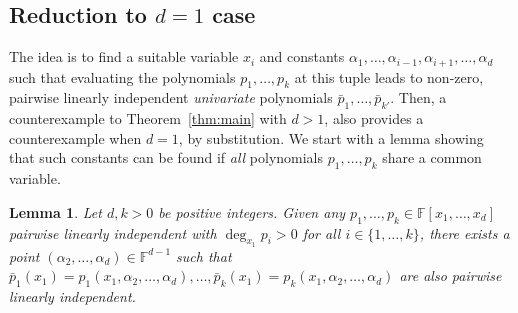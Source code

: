 \documentclass{amsart}
\newtheorem{lemma}[theorem]{Lemma}
\theoremstyle{definition}
\theoremstyle{remark}
\numberwithin{equation}{section}
\newcommand{\F}{\mathbb{F}}
\begin{document}
\subsection{Reduction to $ d=1 $ case}
\label{sse:reduction_to_d1}
The idea is to find a suitable variable $ x_i $ and constants $ \alpha_1,
\ldots, \alpha_{i-1}, \alpha_{i+1}, \ldots, \alpha_d $ such that evaluating the polynomials
$ p_1, \ldots, p_k $ at this tuple leads to
non-zero, pairwise linearly independent \emph{univariate} polynomials $
\bar{p}_1, \ldots, \bar{p}_{k'} $. Then, a counterexample to
Theorem~\ref{thm:main} with $ d > 1 $, also provides a counterexample when $ d =
1 $, by substitution. We start with a lemma showing that such constants can be found
if \emph{all} polynomials $ p_1, \ldots, p_k $ share a common variable. 

\begin{lemma}
	\label{lem:projection}
	Let $ d,k>0 $ be positive integers. Given any $ p_1, \ldots, p_k
	\in \F[x_1, \ldots, x_d]$ pairwise linearly independent with $ \deg_{x_1}
	p_i > 0 $ for all $ i \in \{1, \ldots, k\} $,
	there exists a point $ (\alpha_2, \ldots, \alpha_d) \in \F^{d-1} $ such that
	$ \bar{p}_1(x_1) = p_1(x_1, \alpha_2, \ldots, \alpha_d), \ldots,
	\bar{p}_k(x_1) = p_k(x_1, \alpha_2, \ldots, \alpha_d) $ are also pairwise linearly independent.
\end{lemma}
\end{document}
